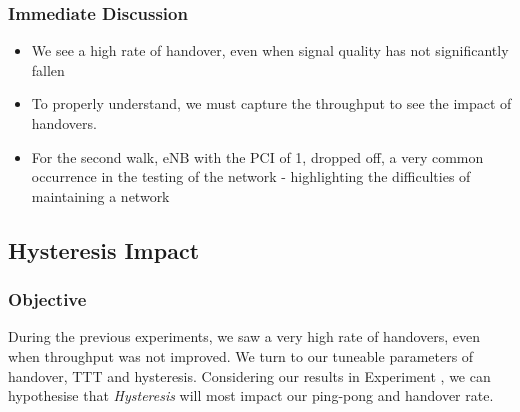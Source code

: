 

\subsubsection{Immediate Discussion}
\begin{itemize}
    \item We see a high rate of handover, even when signal quality has not significantly fallen
    \item To properly understand, we must capture the throughput to see the impact of handovers.
    \item For the second walk, eNB with the PCI of 1, dropped off, a very common occurrence in the testing of the network - highlighting the difficulties of maintaining a network
\end{itemize}





\subsection{Hysteresis Impact}
\tocomplete{}
\subsubsection{Objective}
During the previous experiments, we saw a very high rate of handovers, even when throughput was not improved. We turn to our tuneable parameters of handover, TTT and hysteresis. Considering our results in Experiment \label{sec:exp:custom}, we can hypothesise that \textit{Hysteresis} will most impact our ping-pong and handover rate.

